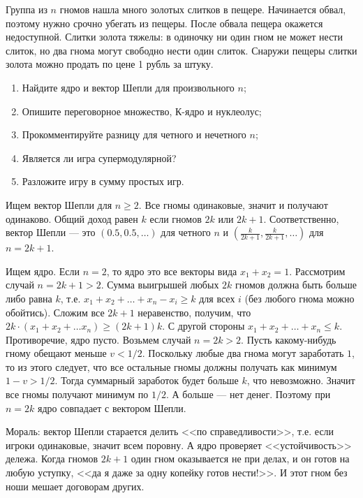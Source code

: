 \begin{problem}
 Группа из $n$ гномов нашла много золотых слитков в пещере. Начинается обвал, поэтому нужно срочно убегать из пещеры. После обвала пещера окажется недоступной. Слитки золота тяжелы: в одиночку ни один гном не может нести слиток, но два гнома могут свободно нести один слиток. Снаружи пещеры слитки золота можно продать по цене 1 рубль за штуку.
\begin{enumerate}
\item Найдите ядро и вектор Шепли для произвольного $n$;
\item Опишите переговорное множество, К-ядро и нуклеолус;
\item Прокомментируйте разницу для четного и нечетного $n$;
\item Является ли игра супермодулярной?
\item Разложите игру в сумму простых игр.
\end{enumerate}




\begin{sol}
Ищем вектор Шепли для $n\geq 2$. Все гномы одинаковые, значит и получают одинаково. Общий доход равен $k$ если гномов $2k$ или $2k+1$. Соответственно, вектор Шепли --- это $(0.5,0.5,\ldots )$ для четного $n$ и $(\frac{k}{2k+1},\frac{k}{2k+1},\ldots )$ для $n=2k+1$.

Ищем ядро. Если $n=2$, то ядро это все векторы вида $x_{1}+x_{2}=1$. Рассмотрим случай $n=2k+1>2$. Сумма выигрышей любых $2k$ гномов должна быть больше либо равна $k$, т.е. $x_{1}+x_{2}+\ldots +x_{n}-x_{i}\geq k$ для всех $i$ (без любого гнома можно обойтись). Сложим все $2k+1$ неравенство, получим, что $2k\cdot (x_{1}+x_{2}+\ldots x_{n})\geq (2k+1)k$. С другой стороны $x_{1}+x_{2}+\ldots +x_{n}\leq k$. Противоречие, ядро пусто. Возьмем случай $n=2k>2$. Пусть какому-нибудь гному обещают меньше $v<1/2$. Поскольку любые два гнома могут заработать $1$, то из этого следует, что все остальные гномы должны получать как минимум $1-v>1/2$. Тогда суммарный заработок будет больше $k$, что невозможно. Значит все гномы получают минимум по $1/2$. А больше  --- нет денег. Поэтому при $n=2k$ ядро совпадает с вектором Шепли.

Мораль: вектор Шепли старается делить <<по справедливости>>, т.е. если игроки одинаковые, значит всем поровну. А ядро проверяет <<устойчивость>> дележа. Когда гномов $2k+1$ один гном оказывается не при делах, и он готов на любую уступку, <<да я даже за одну копейку готов нести!>>. И этот гном без ноши мешает договорам других.
\end{sol}
\end{problem}



